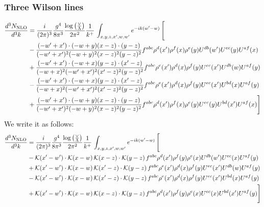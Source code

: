 \documentclass[aps,prd,amsmath,amssymb,nofootinbib]{revtex4-2}
\numberwithin{equation}{section}
\begin{document}
\subsubsection{Three Wilson lines}
\begin{align}
      \frac{d^{3}N_{\rm NLO}}{d^{3}k} & = \frac{i}{(2\pi)^{3}}\frac{g^{4}}{8\pi^{3}}\frac{\log{\left(\frac{\vee}{\Lambda}\right)}}{2\pi^{2}} \frac{1}{k^{+}}\,\int_{x,y,z,x^{\prime},w,w^{\prime}}e^{-ik(w^{\prime}-w)}\, \Bigg[\notag \\ & -  \frac{( - w' + x') \cdot ( - w + y) (x - z) \cdot (y - z)}{( - w' + x')^{2} ( - w + y)^{2} (x - z)^{2} (y - z)^{2}} f^{a b c} \rho^{d}(x') \rho^{f}(x) \rho^{e}(y) U^{d b}(w') U^{e c}(y) U^{a f}(x)\nonumber\\
    &+  \frac{( - w' + x') \cdot ( - w + x) (y - z) \cdot (x' - z)}{( - w + x)^{2} ( - w' + x')^{2} (x' - z)^{2} (y - z)^{2}} f^{a b c} \rho^{e}(x') \rho^{d}(x) \rho^{f}(y) U^{e c}(x') U^{d b}(w) U^{a f}(y)\nonumber\\
    &- \frac{( - w' + x') \cdot ( - w + x) (y - z) \cdot (x' - z)}{( - w + x)^{2} ( - w' + x')^{2} (x' - z)^{2} (y - z)^{2}} f^{a b c} \rho^{e}(x') \rho^{d}(x) \rho^{f}(y) U^{e c}(x') U^{b d}(x) U^{a f}(y)\nonumber\\
    &+  \frac{( - w' + x') \cdot ( - w + y) (x - z) \cdot (y - z)}{( - w' + x')^{2} ( - w + y)^{2} (x - z)^{2} (y - z)^{2}} f^{a b c} \rho^{d}(x') \rho^{f}(x) \rho^{e}(y) U^{e c}(y) U^{b d}(x') U^{a f}(x) \Bigg]
\end{align}
We write it as follows:
\begin{align}
      \frac{d^{3}N_{\rm NLO}}{d^{3}k} & = \frac{i}{(2\pi)^{3}}\frac{g^{4}}{8\pi^{3}}\frac{\log{\left(\frac{\vee}{\Lambda}\right)}}{2\pi^{2}} \frac{1}{k^{+}}\,\int_{x,y,z,x^{\prime},w,w^{\prime}}e^{-ik(w^{\prime}-w)}\, \Bigg[\notag \\ & - \mathcal{K}(x'-w')\cdot \mathcal{K}(x-w)\, \mathcal{K}(x-z)\cdot \mathcal{K}(y-z)\, f^{a b c} \rho^{d}(x') \rho^{f}(y) \rho^{e}(x) U^{d b}(w') U^{e c}(x) U^{a f}(y)\nonumber\\
    &+ \mathcal{K}(x'-w')\cdot \mathcal{K}(x-w)\,\mathcal{K}(x'-z)\cdot \mathcal{K}(y-z)\, f^{a b c} \rho^{e}(x') \rho^{d}(x) \rho^{f}(y) U^{e c}(x') U^{d b}(w) U^{a f}(y)\nonumber\\
    &- \mathcal{K}(x'-w')\cdot \mathcal{K}(x-w)\,\mathcal{K}(x'-z)\cdot \mathcal{K}(y-z)\, f^{a b c} \rho^{e}(x') \rho^{d}(x) \rho^{f}(y) U^{e c}(x') U^{b d}(x) U^{a f}(y)\nonumber\\
    &+  \mathcal{K}(x'-w')\cdot \mathcal{K}(x-w)\, \mathcal{K}(x-z)\cdot \mathcal{K}(y-z)\, f^{a b c} \rho^{d}(x') \rho^{f}(y) \rho^{e}(x) U^{e c}(x) U^{b d}(x') U^{a f}(y) \Bigg]
\end{align}
\end{document}
